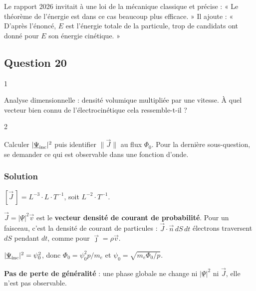 \documentclass[11pt,a4paper]{article}
\begin{document}
\begin{jury}

Le rapport 2026 invitait à une loi de la mécanique classique et précise : « Le théorème de l'énergie est dans ce cas beaucoup plus efficace. » Il ajoute : « D'après l'énoncé, \(E\) est l'énergie totale de la particule, trop de candidats ont donné pour \(E\) son énergie cinétique. »

\end{jury}

\hypertarget{question-20}{%
\subsection{Question 20}\label{question-20}}

\begin{indication}{1}

Analyse dimensionnelle : densité volumique multipliée par une vitesse. À quel vecteur bien connu de l'électrocinétique cela ressemble-t-il ?

\end{indication}

\begin{indication}{2}

Calculer \(|\underline\Psi_{\rm inc}|^2\) puis identifier \(\|\vec J\|\) au flux \(\Phi_0\). Pour la dernière sous-question, se demander ce qui est observable dans une fonction d'onde.

\end{indication}

\hypertarget{solution-19}{%
\subsubsection{Solution}\label{solution-19}}

\([\vec J\,]=L^{-3}\cdot L\cdot T^{-1}\), soit \(\boxed{L^{-2}\cdot T^{-1}}\).

\(\vec J=|\underline\Psi|^2\vec v\) est le \textbf{vecteur densité de courant de probabilité}. Pour un faisceau, c'est la densité de courant de particules : \(\vec J\cdot\vec n\,dS\,dt\) électrons traversent \(dS\) pendant \(dt\), comme pour \(\vec\jmath=\rho\vec v\).

\(|\underline\Psi_{\rm inc}|^2=\psi_0^2\), donc \(\Phi_0=\psi_0^2p/m_e\) et \(\boxed{\psi_0=\sqrt{m_e\Phi_0/p}}\).

\textbf{Pas de perte de généralité} : une phase globale ne change ni \(|\underline\Psi|^2\) ni \(\vec J\), elle n'est pas observable.
\end{document}
